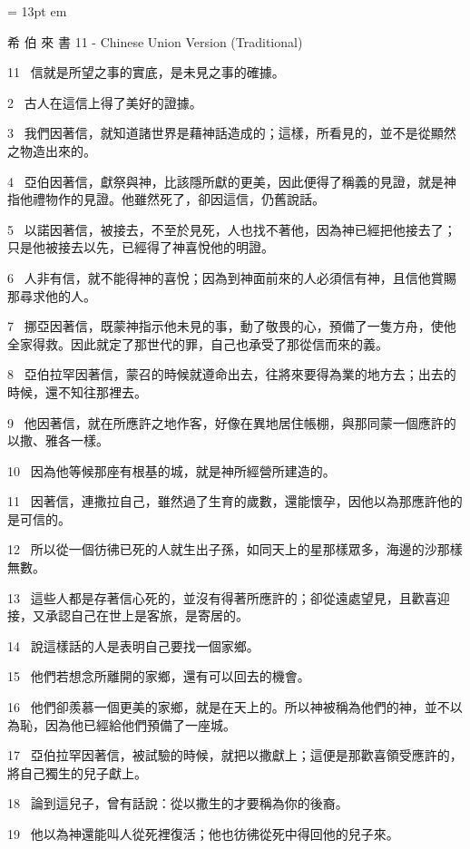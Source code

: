 
\FFrh \baselineskip = 13pt
 em


\centerline{  \FFbg
希 伯 來 書 11 - Chinese Union Version (Traditional) }

\par
11 
信就是所望之事的實底，是未見之事的確據。
\par
2 
古人在這信上得了美好的證據。
\par
3 
我們因著信，就知道諸世界是藉神話造成的；這樣，所看見的，並不是從顯然之物造出來的。
\par
4 
亞伯因著信，獻祭與神，比該隱所獻的更美，因此便得了稱義的見證，就是神指他禮物作的見證。他雖然死了，卻因這信，仍舊說話。
\par
5 
以諾因著信，被接去，不至於見死，人也找不著他，因為神已經把他接去了；只是他被接去以先，已經得了神喜悅他的明證。
\par
6 
人非有信，就不能得神的喜悅；因為到神面前來的人必須信有神，且信他賞賜那尋求他的人。
\par
7 
挪亞因著信，既蒙神指示他未見的事，動了敬畏的心，預備了一隻方舟，使他全家得救。因此就定了那世代的罪，自己也承受了那從信而來的義。
\par
8 
亞伯拉罕因著信，蒙召的時候就遵命出去，往將來要得為業的地方去；出去的時候，還不知往那裡去。
\par
9 
他因著信，就在所應許之地作客，好像在異地居住帳棚，與那同蒙一個應許的以撒、雅各一樣。
\par
10 
因為他等候那座有根基的城，就是神所經營所建造的。
\par
11 
因著信，連撒拉自己，雖然過了生育的歲數，還能懷孕，因他以為那應許他的是可信的。
\par
12 
所以從一個彷彿已死的人就生出子孫，如同天上的星那樣眾多，海邊的沙那樣無數。
\par
13 
這些人都是存著信心死的，並沒有得著所應許的；卻從遠處望見，且歡喜迎接，又承認自己在世上是客旅，是寄居的。
\par
14 
說這樣話的人是表明自己要找一個家鄉。
\par
15 
他們若想念所離開的家鄉，還有可以回去的機會。
\par
16 
他們卻羨慕一個更美的家鄉，就是在天上的。所以神被稱為他們的神，並不以為恥，因為他已經給他們預備了一座城。
\par
17 
亞伯拉罕因著信，被試驗的時候，就把以撒獻上；這便是那歡喜領受應許的，將自己獨生的兒子獻上。
\par
18 
論到這兒子，曾有話說：從以撒生的才要稱為你的後裔。
\par
19 
他以為神還能叫人從死裡復活；他也彷彿從死中得回他的兒子來。
